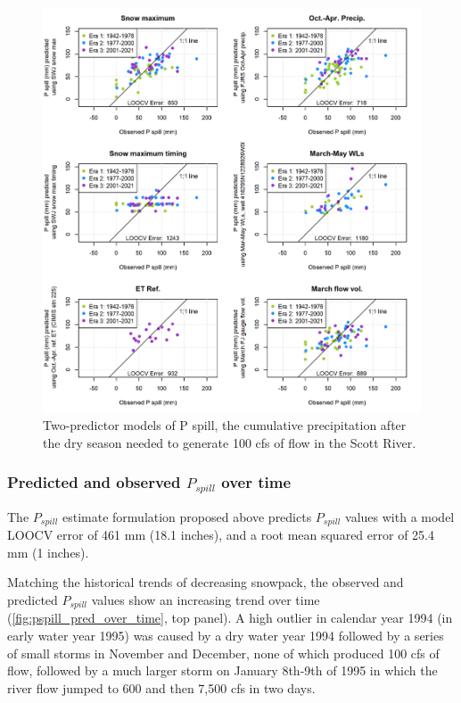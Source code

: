 \documentclass[
]{article}
\begin{document}
\begin{figure}
\includegraphics[width=1\linewidth]{f14} \caption{\label{fig:two_predictor_model_p_spill} Two-predictor models of P spill, the cumulative precipitation after the dry season needed to generate 100 cfs of flow in the Scott River.}\label{fig:two_predictor_model_p_spill}
\end{figure}

\hypertarget{predicted-and-observed-p_spill-over-time}{%
\subsubsection{\texorpdfstring{Predicted and observed \(P_{spill}\) over
time}{Predicted and observed P\_\{spill\} over time}}\label{predicted-and-observed-p_spill-over-time}}

The \(P_{spill}\) estimate formulation proposed above predicts
\(P_{spill}\) values with a model LOOCV error of 461 mm (18.1 inches),
and a root mean squared error of 25.4 mm (1 inches).

Matching the historical trends of decreasing snowpack, the observed and
predicted \(P_{spill}\) values show an increasing trend over time
(\autoref{fig:pspill_pred_over_time}, top panel). A high outlier in
calendar year 1994 (in early water year 1995) was caused by a dry water
year 1994 followed by a series of small storms in November and December,
none of which produced 100 cfs of flow, followed by a much larger storm
on January 8th-9th of 1995 in which the river flow jumped to 600 and
then 7,500 cfs in two days.
\end{document}
